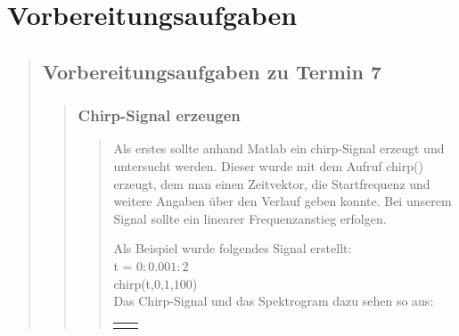 \section{Vorbereitungsaufgaben}
\begin{quote}
    
    \subsection{Vorbereitungsaufgaben zu Termin 7}
    \begin{quote}
        
        \subsubsection{Chirp-Signal erzeugen}
        \begin{quote}
        
        Als erstes sollte anhand Matlab ein chirp-Signal erzeugt und untersucht
        werden. Dieser wurde mit dem Aufruf chirp() erzeugt, dem man einen
        Zeitvektor, die Startfrequenz und weitere Angaben über den Verlauf geben
        konnte. Bei unserem Signal sollte ein linearer Frequenzanstieg erfolgen. 
        
        Als Beispiel wurde folgendes Signal erstellt:\\
        t = $0:0.001:2$\\
        chirp(t,$0$,$1$,$100$)\\
        
        Das Chirp-Signal und das Spektrogram dazu sehen so aus:
        
        \begin{center}
                \begin{tabular}{ll}
    
                \hspace{-12em}
                    \begin{minipage}{0.6\textwidth}
    

\end{minipage}
\end{tabular}
\end{center}
\end{quote}
\end{quote}
\end{quote}
